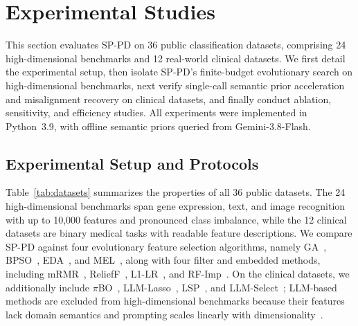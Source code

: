
\section{Experimental Studies}
\label{sec:experiments}

This section evaluates SP-PD on 36 public classification datasets, comprising 24 high-dimensional benchmarks and 12 real-world clinical datasets. We first detail the experimental setup, then isolate SP-PD's finite-budget evolutionary search on high-dimensional benchmarks, next verify single-call semantic prior acceleration and misalignment recovery on clinical datasets, and finally conduct ablation, sensitivity, and efficiency studies. All experiments were implemented in Python~3.9, with offline semantic priors queried from Gemini-3.8-Flash.

\subsection{Experimental Setup and Protocols}
\label{sec:exp_setup}

Table~\ref{tab:datasets} summarizes the properties of all 36 public datasets. The 24 high-dimensional benchmarks span gene expression, text, and image recognition with up to 10,000 features and pronounced class imbalance, while the 12 clinical datasets are binary medical tasks with readable feature descriptions. We compare SP-PD against four evolutionary feature selection algorithms, namely GA~\cite{holland1992ga}, BPSO~\cite{kennedy1997bpso}, EDA~\cite{baluja1994pbil}, and MEL~\cite{wang2024mel}, along with four filter and embedded methods, including mRMR~\cite{peng2005mrmr}, ReliefF~\cite{kononenko1994relieff}, L1-LR~\cite{tibshirani1996lasso}, and RF-Imp~\cite{breiman2001rf}. On the clinical datasets, we additionally include $\pi$BO~\cite{hvarfner2022pibo}, LLM-Lasso~\cite{zhang2025llmlasso}, LSP~\cite{skinner2026lsp}, and LLM-Select~\cite{jeong2024llmselect}; LLM-based methods are excluded from high-dimensional benchmarks because their features lack domain semantics and prompting scales linearly with dimensionality~\cite{zhang2025llmlasso,jeong2024llmselect}.


